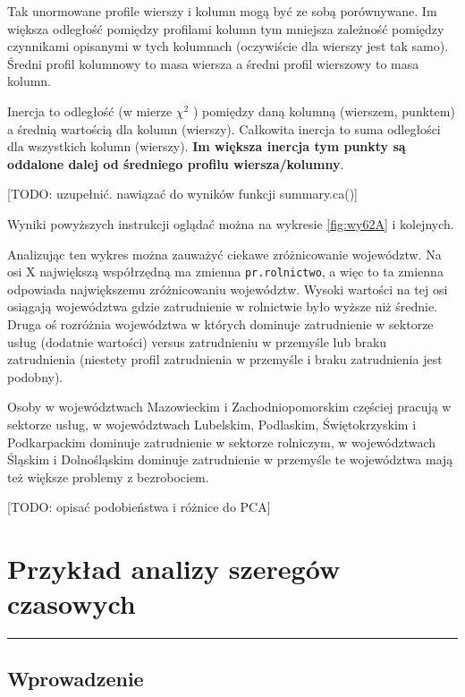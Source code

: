 \documentclass[polish,]{book}
\begin{document}
Tak unormowane profile wierszy i kolumn mogą być ze sobą porównywane. Im
większa odległość pomiędzy profilami kolumn tym mniejsza zależność pomiędzy
czynnikami opisanymi w tych kolumnach (oczywiście dla wierszy jest tak samo).
Średni profil kolumnowy to masa wiersza a średni profil wierszowy to masa kolumn.

Inercja to odległość (w mierze \(\chi^2\) ) pomiędzy daną kolumną (wierszem, punktem)
a średnią wartością dla kolumn (wierszy). Całkowita inercja to suma odległości dla
wszystkich kolumn (wierszy). \textbf{Im większa inercja tym punkty są oddalone
dalej od średniego profilu wiersza/kolumny}.

{[}TODO: uzupełnić. nawiązać do wyników funkcji summary.ca(){]}

Wyniki powyższych instrukcji oglądać można na wykresie \ref{fig:wy62A} i kolejnych.

Analizując ten wykres można zauważyć ciekawe zróżnicowanie województw. Na
osi X największą współrzędną ma zmienna \texttt{pr.rolnictwo}, a więc to ta zmienna odpowiada największemu zróżnicowaniu województw. Wysoki wartości na tej osi osiągają województwa gdzie zatrudnienie w rolnictwie było wyższe niż średnie. Druga
oś rozróżnia województwa w których dominuje zatrudnienie w sektorze usług (dodatnie wartości) versus zatrudnieniu w przemyśle lub braku zatrudnienia (niestety
profil zatrudnienia w przemyśle i braku zatrudnienia jest podobny).

Osoby w województwach Mazowieckim i Zachodniopomorskim częściej pracują
w sektorze usług, w województwach Lubelskim, Podlaskim, Świętokrzyskim i Podkarpackim dominuje zatrudnienie w sektorze rolniczym, w województwach Śląskim i
Dolnośląskim dominuje zatrudnienie w przemyśle te województwa mają też większe
problemy z bezrobociem.

{[}TODO: opisać podobieństwa i różnice do PCA{]}

\hypertarget{part_7}{%
\chapter{Przykład analizy szeregów czasowych}\label{part_7}}

\begin{center}\rule{0.5\linewidth}{\linethickness}\end{center}

\hypertarget{part_71}{%
\section{Wprowadzenie}\label{part_71}}
\end{document}
